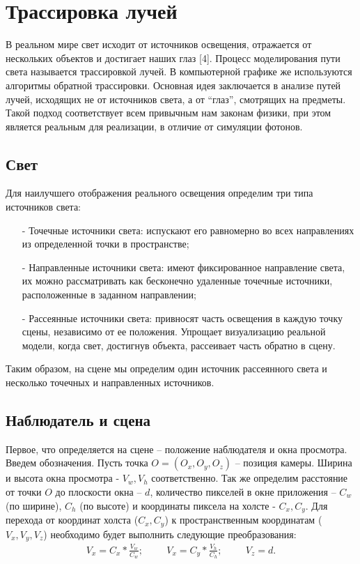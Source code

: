 \section{Трассировка лучей}

В реальном мире свет исходит от источников освещения, отражается от
нескольких объектов и достигает наших глаз [4]. Процесс моделирования пути света называется трассировкой лучей. В компьютерной графике же используются алгоритмы обратной трассировки. Основная идея заключается в анализе путей лучей, исходящих не от источников света, а от “глаз”, смотрящих на предметы. Такой подход соответствует всем привычным нам законам физики, при этом является реальным для реализации, в отличие от симуляции фотонов.

\subsection{Свет}

Для наилучшего отображения реального освещения определим три типа
источников света:
\begin{itemize}[label=\arabic*)]
	\item[-] Точечные источники света: испускают его равномерно во всех направлениях из определенной точки в пространстве;
	\item[-] Направленные источники света: имеют фиксированное направление света, их можно рассматривать как бесконечно удаленные точечные источники, расположенные в заданном направлении;
	\item[-] Рассеянные источники света: привносят часть освещения в каждую точку сцены, независимо от ее положения. Упрощает визуализацию реальной модели, когда свет, достигнув объекта, рассеивает часть обратно в сцену.
\end{itemize}

Таким образом, на сцене мы определим один источник рассеянного света и несколько точечных и направленных источников.

\subsection{Наблюдатель и сцена}

Первое, что определяется на сцене – положение наблюдателя и окна просмотра. Введем обозначения. Пусть точка $O = (O_{x}, O_{y}, O_{z})$ – позиция камеры. Ширина и высота окна просмотра - $V_{w}, V_{h}$ соответственно. Так же определим расстояние от точки $O$ до плоскости окна – $d$, количество пикселей в окне приложения – $C_{w}$ (по ширине), $C_{h}$ (по высоте) и координаты пиксела на холсте - $C_{x}, C_{y}$.
Для перехода от координат холста ($C_{x}, C_{y}$) к пространственным координатам ($V_{x}, V_{y}, V_{z}$) необходимо будет выполнить следующие преобразования:
\begin{gather}
	V_{x} = C_{x}*\frac{V_{w}}{C_{w}};\hspace{1cm}V_{x} = C_{y}*\frac{V_{h}}{C_{h}};\hspace{1cm}V_{z} = d.
\end{gather}

